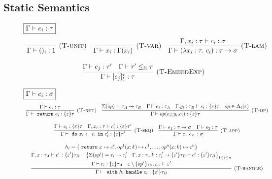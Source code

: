 \documentclass{article}
\theoremstyle{definition}
\newcommand{\m}[1]{\ \texttt{#1}\ }
\begin{document}
\subsection{Static Semantics}
\begin{figure}[H]
\footnotesize{
\noindent$\fbox{$\Gamma \vdash e_i : \tau$}$
\[
\begin{array}{c}

\infer[\textsc{(T-unit)}]
  {\Gamma \vdash ()_i : 1}
  {} \quad 

\infer[\textsc{(T-var)}]
  {\Gamma \vdash x_i : \Gamma(x_i)}
  {} \quad 

\infer[\textsc{(T-lam)}]
  {\Gamma \vdash (\lambda x_i: \tau.\ c_i) : \tau \rightarrow \sigma}
  {\Gamma, x_i:\tau \vdash c_i : \sigma} \\[3ex]
  
\infer[\textsc{(T-EmbedExp)}]
  {\Gamma \vdash [e_j]^\tau_l : \tau}
  {\Gamma \vdash e_j : \tau' & \Gamma \vdash \tau' \leq_{li} \tau} \quad  
\end{array} \\[3ex]
\]


\noindent$\fbox{$\Gamma \vdash c_i : \sigma$}$
\[
\begin{array}{c}

\infer[\textsc{(T-ret)}]
  {\Gamma\vdash \m{return} e_i : \{\varepsilon\}\tau }
  {\Gamma\vdash e_i : \tau} \quad 
  
\infer[\textsc{(T-op)}]
  {\Gamma\vdash op(e_i; y_i.c_i) : \{\varepsilon\}\tau }
  {\Sigma(op) = \tau_A \rightarrow \tau_B & \Gamma \vdash e_i : \tau_A & \Gamma. y_i:\tau_B\vdash c_i: \{\varepsilon\}\tau & op \in \Delta_i(\varepsilon)} \\[3ex]


\infer[\textsc{(T-seq)}]
  {\Gamma\vdash \m{do} x_i \leftarrow c_i \m{in} c_i' : \{\varepsilon\}\tau' }
  {\Gamma \vdash c_i : \{\varepsilon\}\tau & \Gamma, x_i:\tau \vdash c_i': \{\varepsilon\}\tau'} \quad 
  
  
\infer[\textsc{(T-app)}]
  {\Gamma\vdash e_1\ e_2\ : \sigma }
  {\Gamma \vdash e_1 : \tau \rightarrow \sigma & \Gamma \vdash e_2 : \tau} \\[3ex]
  
\infer[\textsc{(T-handle)}]
  {\Gamma\vdash \m{with} h_i \m{handle} c_i: \{\varepsilon'\} \tau_B}
  {\begin{gathered}
  h_i = \{\m{return} x \mapsto c^r, op^1(x;k) \mapsto c^1, \dots, op^n(x;k) \mapsto c^n \}\\
  \Gamma, x: \tau_A \vdash c^r : \{\varepsilon'\}\tau_B \quad
  \left\{ \Sigma(op^i) = \tau_i \rightarrow \tau_i'  \quad \Gamma, x:\tau_i, k:\tau_i' \rightarrow \{\varepsilon'\}\tau_B \vdash c^i: \{\varepsilon'\}\tau_B    \right\}_{1 \leq i \leq n} \\
  \Gamma \vdash c_i : \{\varepsilon\}\tau_A \quad \varepsilon \setminus \{op^i\}_{1 \leq i \leq n} \subseteq \varepsilon'
  \end{gathered}} \\[3ex]
  

\end{array}\]}
\end{figure}
\end{document}
